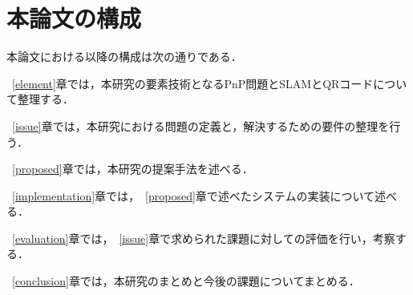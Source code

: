 \section{本論文の構成}

本論文における以降の構成は次の通りである．


~\ref{element}章では，本研究の要素技術となるPnP問題とSLAMとQRコードについて整理する．

~\ref{issue}章では，本研究における問題の定義と，解決するための要件の整理を行う．

~\ref{proposed}章では，本研究の提案手法を述べる．

~\ref{implementation}章では，~\ref{proposed}章で述べたシステムの実装について述べる．

~\ref{evaluation}章では，~\ref{issue}章で求められた課題に対しての評価を行い，考察する．

~\ref{conclusion}章では，本研究のまとめと今後の課題についてまとめる．
